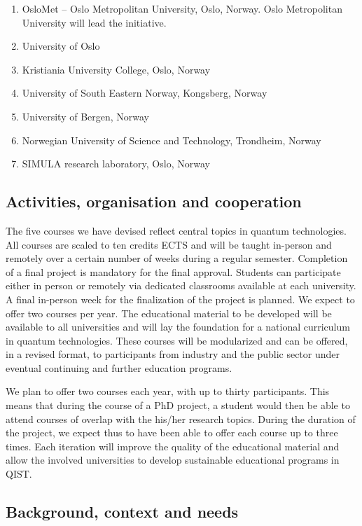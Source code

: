 \documentclass{scrreprt}
\begin{document}
\begin{enumerate}
\item OsloMet -- Oslo Metropolitan University, Oslo, Norway. Oslo Metropolitan University will lead the initiative.
\item 
University of Oslo
\item Kristiania University College, Oslo, Norway
\item University of South Eastern Norway, Kongsberg, Norway
\item 
University of Bergen, Norway
\item 
Norwegian University of Science and Technology, Trondheim, Norway
\item SIMULA research laboratory, Oslo, Norway
\end{enumerate}


\subsection{Activities, organisation and cooperation}

The five courses we have devised reflect central topics in quantum
technologies. All courses are scaled to ten credits ECTS and will be
taught in-person and remotely over a certain number of weeks during a
regular semester. Completion of a final project is mandatory
for the final approval.  Students can participate either in person or
remotely via dedicated classrooms available at each university.  A
final in-person week for the finalization of the project is planned.
We expect to offer two courses per year. The educational material to
be developed will be available to all universities and will lay the
foundation for a national curriculum in quantum technologies. These
courses will be modularized and can be offered, in a revised format,
to participants from industry and the public sector under eventual
continuing and further education programs.

We plan to offer two courses each year, with up to thirty participants. This means that during the course of a PhD project, a student would then be able to attend courses of overlap with the his/her research topics. 
During the duration of the project, we expect thus to have been able to offer each course up to three times. 
Each iteration will improve the quality of the educational material and allow the involved universities to develop sustainable educational programs in QIST.

\subsection{Background, context and needs}
\end{document}
